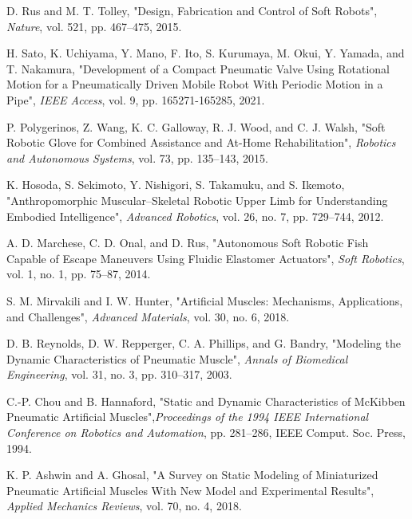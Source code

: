 \documentclass[letterpaper, 10 pt, conference]{IEEEconf}
\begin{document}
\begin{thebibliography}{99}

     D. Rus and M. T. Tolley, "Design, Fabrication and Control of Soft Robots", \textit{Nature}, vol. 521, pp. 467--475, 2015.
    
     H. Sato, K. Uchiyama, Y. Mano, F. Ito, S. Kurumaya, M. Okui, Y. Yamada, and T. Nakamura, "Development of a Compact Pneumatic Valve Using Rotational Motion for a Pneumatically Driven Mobile Robot With Periodic Motion in a Pipe", \textit{IEEE Access}, vol. 9, pp. 165271-165285, 2021.
    
     P. Polygerinos, Z. Wang, K. C. Galloway, R. J. Wood, and C. J. Walsh, "Soft Robotic Glove for Combined Assistance and At-Home Rehabilitation", \textit{Robotics and Autonomous Systems}, vol. 73, pp. 135--143, 2015.
    
     K. Hosoda, S. Sekimoto, Y. Nishigori, S. Takamuku, and S. Ikemoto, "Anthropomorphic Muscular–Skeletal Robotic Upper Limb for Understanding Embodied Intelligence", \textit{Advanced Robotics}, vol. 26, no. 7, pp. 729--744, 2012.
    
     A. D. Marchese, C. D. Onal, and D. Rus, "Autonomous Soft Robotic Fish Capable of Escape Maneuvers Using Fluidic Elastomer Actuators", \textit{Soft Robotics}, vol. 1, no. 1, pp. 75--87, 2014.
    
     S. M. Mirvakili and I. W. Hunter, "Artificial Muscles: Mechanisms, Applications, and Challenges", \textit{Advanced Materials}, vol. 30, no. 6, 2018.
    
     D. B. Reynolds, D. W. Repperger, C. A. Phillips, and G. Bandry, "Modeling the Dynamic Characteristics of Pneumatic Muscle", \textit{Annals of Biomedical Engineering}, vol. 31, no. 3, pp. 310--317, 2003.
    
     C.-P. Chou and B. Hannaford, "Static and Dynamic Characteristics of McKibben Pneumatic Artificial Muscles",\textit{Proceedings of the 1994 IEEE International Conference on Robotics and Automation}, pp. 281--286, IEEE Comput. Soc. Press, 1994.
    
     K. P. Ashwin and A. Ghosal, "A Survey on Static Modeling of Miniaturized Pneumatic Artificial Muscles With New Model and Experimental Results", \textit{Applied Mechanics Reviews}, vol. 70, no. 4, 2018.
    

\end{thebibliography}
\end{document}
